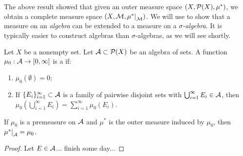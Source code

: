     \newpage
    The above result showed that given an outer measure space $(X,\mathcal{P}(X),\mu^\ast)$, we obtain a complete measure space $(X,\cM,\restr{\mu^\ast}{\cM})$. We will use  to show that a measure on an \textit{algebra} can be extended to a measure on a \textit{$\sigma$-algebra}. It is typically easier to construct algebras than $\sigma$-algebras, as we will see shortly.

    \begin{definition}
        Let $X$ be a nonempty set. Let $\mathcal{A} \subset \mathcal{P}(X)$ be an algebra of sets. A function $\mu_0 :\mathcal{A} \rightarrow [0,\infty]$ is a  if:
            \begin{enumerate}[label = (\arabic*),itemsep=1pt,topsep=3pt]
                \item $\mu_0 (\emptyset) = 0$;
                \item If $\{E_i\}_{i = 1}^\infty \subset \mathcal{A}$ is a family of pairwise disjoint sets with $\bigcup_{i = 1}^\infty E_i \in \mathcal{A}$, then $\mu_0 \left( \bigcup_{i = 1}^\infty E_i\right) = \sum_{i = 1}^\infty \mu_0 (E_i)$.
            \end{enumerate}
    \end{definition}

    \begin{proposition}
        If $\mu_0$ is a premeasure on $\mathcal{A}$ and $\mu^\ast$ is the outer measure induced by $\mu_0$, then $\restr{\mu^\ast}{\cA} = \mu_0$.
    \end{proposition}
        \begin{proof}
            Let $E \in \mathcal{A}$... {\color{red} finish some day...}
        \end{proof}

